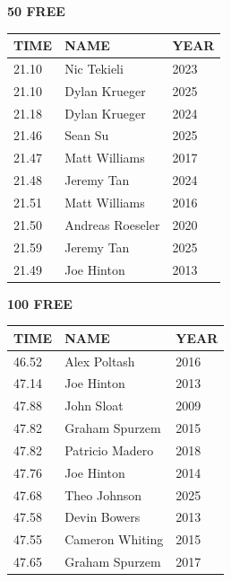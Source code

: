 \begin{table}[H]
\centering
\begin{minipage}[t]{0.48\textwidth}
\centering
\textbf{50 FREE}\\[0.1cm]
\begin{tabular}{@{}p{1.8cm}p{2.8cm}p{1.2cm}@{}}
\hline
    \textbf{TIME} & \textbf{NAME} & \textbf{YEAR} \\
\hline
    21.10 & Nic Tekieli & 2023 \\
    21.10 & Dylan Krueger & 2025 \\
    21.18 & Dylan Krueger & 2024 \\
    21.46 & Sean Su & 2025 \\
    21.47 & Matt Williams & 2017 \\
    21.48 & Jeremy Tan & 2024 \\
    21.51 & Matt Williams & 2016 \\
    21.50 & Andreas Roeseler & 2020 \\
    21.59 & Jeremy Tan & 2025 \\
    21.49 & Joe Hinton & 2013 \\
\hline
\end{tabular}
\end{minipage}\hfill
\begin{minipage}[t]{0.48\textwidth}
\centering
\textbf{100 FREE}\\[0.1cm]
\begin{tabular}{@{}p{1.8cm}p{2.8cm}p{1.2cm}@{}}
\hline
    \textbf{TIME} & \textbf{NAME} & \textbf{YEAR} \\
\hline
    46.52 & Alex Poltash & 2016 \\
    47.14 & Joe Hinton & 2013 \\
    47.88 & John Sloat & 2009 \\
    47.82 & Graham Spurzem & 2015 \\
    47.82 & Patricio Madero & 2018 \\
    47.76 & Joe Hinton & 2014 \\
    47.68 & Theo Johnson & 2025 \\
    47.58 & Devin Bowers & 2013 \\
    47.55 & Cameron Whiting & 2015 \\
    47.65 & Graham Spurzem & 2017 \\
\hline
\end{tabular}
\end{minipage}
\end{table}

